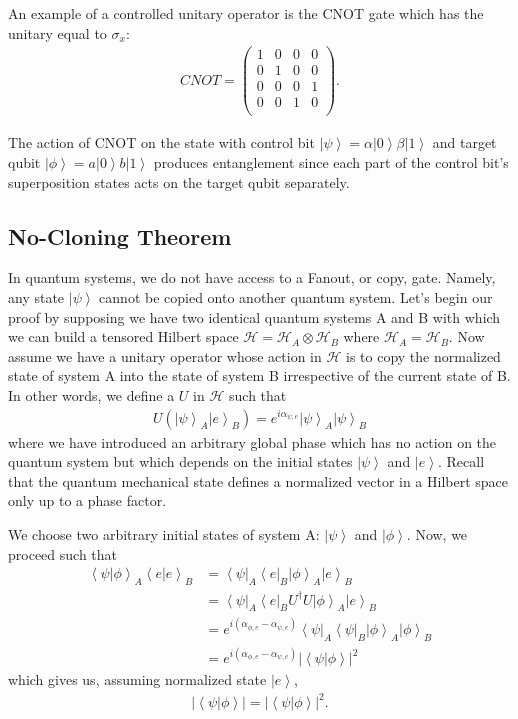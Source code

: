 \documentclass[11pt]{article} %
\newcommand{\bra}[1]{\left\langle #1 \right|}
\newcommand{\ket}[1]{\left|#1\right\rangle}
\newcommand{\braket}[2]{\left\langle#1 |  #2\right\rangle}
\begin{document}
An example of a controlled unitary operator is the CNOT gate which has the unitary equal to $\sigma_x$:
\begin{align}
    CNOT = 
    \begin{pmatrix}
    1 & 0 & 0 & 0\\
    0 & 1 & 0 & 0\\
    0 & 0 & 0 & 1\\
    0 & 0 & 1 & 0\\
    \end{pmatrix}.
\end{align}

The action of CNOT on the state with control bit $\ket{\psi} = \alpha\ket{0} \beta\ket{1}$ and target qubit $\ket{\phi} = a\ket{0} b\ket{1}$ produces entanglement since each part of the control bit's superposition states acts on the target qubit separately.

\subsection{No-Cloning Theorem}
In quantum systems, we do not have access to a Fanout, or copy, gate. Namely, any state $\ket{\psi}$ cannot be copied onto another quantum system. Let's begin our proof by supposing we have two identical quantum systems A and B with which we can build a tensored Hilbert space $\mathcal{H}=\mathcal{H}_A\otimes\mathcal{H}_B$ where $\mathcal{H}_A=\mathcal{H}_B$. Now assume we have a unitary operator whose action in $\mathcal{H}$ is to copy the normalized state of system A into the state of system B irrespective of the current state of B. In other words, we define a $U$ in $\mathcal{H}$ such that
\begin{align}
    U(\ket{\psi}_A\ket{e}_B) = e^{i\alpha_{\psi,e}}\ket{\psi}_A\ket{\psi}_B
\end{align}
where we have introduced an arbitrary global phase which has no action on the quantum system but which depends on the initial states $\ket{\psi}$ and $\ket{e}$. Recall that the quantum mechanical state defines a normalized vector in a Hilbert space only up to a phase factor.

We choose two arbitrary initial states of system A: $\ket{\psi}$ and $\ket{\phi}$. Now, we proceed such that
\begin{align}
    \braket{\psi}{\phi}_A\braket{e}{e}_B &= \bra{\psi}_A\bra{e}_B\ket{\phi}_A\ket{e}_B\nonumber\\
    &= \bra{\psi}_A\bra{e}_BU^\dagger U\ket{\phi}_A\ket{e}_B\nonumber\\
    &= e^{i(\alpha_{\phi,e}-\alpha_{\psi,e})}\bra{\psi}_A\bra{\psi}_B\ket{\phi}_A\ket{\phi}_B\nonumber\\
    &= e^{i(\alpha_{\phi,e}-\alpha_{\psi,e})}\left|\braket{\psi}{\phi}\right|^2
\end{align}
which gives us, assuming normalized state $\ket{e}$,
\begin{align}
    \left|\braket{\psi}{\phi}\right| = \left|\braket{\psi}{\phi}\right|^2.
\end{align}
\end{document}
